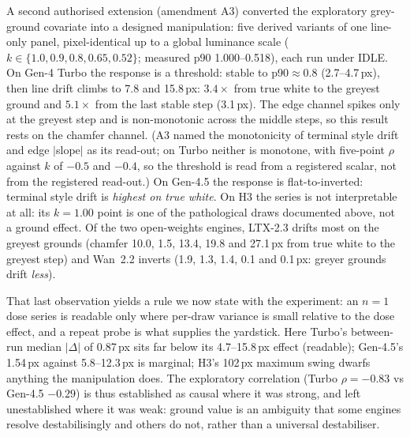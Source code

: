 \documentclass[11pt]{article}
\begin{document}
A second authorised extension (amendment A3) converted the exploratory
grey-ground covariate into a designed manipulation: five derived variants of
one line-only panel, pixel-identical up to a global luminance scale
($k \in \{1.0, 0.9, 0.8, 0.65, 0.52\}$; measured p90 1.000--0.518), each
run under IDLE. On Gen-4 Turbo the response is a threshold: stable to
p90${\approx}$0.8 (2.7--4.7\,px), then line drift climbs to 7.8 and
15.8\,px: $3.4\times$ from true white to the greyest ground and
$5.1\times$ from the last stable step (3.1\,px). The edge channel spikes only at the greyest
step and is non-monotonic across the middle steps, so this result rests on
the chamfer channel. (A3 named the monotonicity of terminal style drift and
edge $|$slope$|$ as its read-out; on Turbo neither is monotone, with five-point
$\rho$ against $k$ of $-0.5$ and $-0.4$, so the threshold is read from a
registered scalar, not from the registered read-out.) On Gen-4.5 the response is
flat-to-inverted: terminal style drift is \emph{highest on true white}.
On H3 the series is not interpretable at all: its $k=1.00$ point is one of
the pathological draws documented above, not a ground effect. Of the two
open-weights engines, LTX-2.3 drifts most on the greyest grounds (chamfer
10.0, 1.5, 13.4, 19.8 and 27.1\,px from true white to the greyest step) and
Wan~2.2 inverts (1.9, 1.3, 1.4, 0.1 and 0.1\,px: greyer grounds drift
\emph{less}).

That last observation yields a rule we now state with the experiment: an
$n=1$ dose series is readable only where per-draw variance is small relative
to the dose effect, and a repeat probe is what supplies the yardstick. Here
Turbo's between-run median $|\Delta|$ of 0.87\,px sits far below its
4.7--15.8\,px effect (readable); Gen-4.5's 1.54\,px against 5.8--12.3\,px is
marginal; H3's 102\,px maximum swing dwarfs anything the manipulation does.
The exploratory correlation (Turbo $\rho=-0.83$ vs Gen-4.5 $-0.29$) is thus
established as causal where it was strong, and left unestablished where it
was weak: ground value is an ambiguity that some engines resolve
destabilisingly and others do not, rather than a universal destabiliser.
\end{document}
